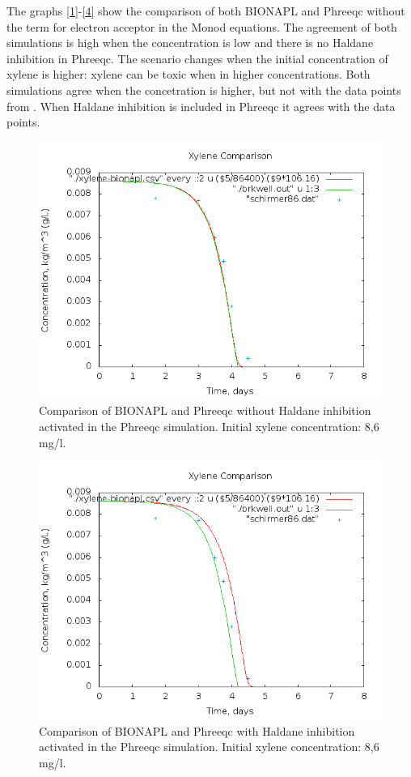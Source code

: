 \documentclass[12pt,twoside]{report}
\begin{document}
The graphs \eqref{1}-\eqref{4} show the comparison of both BIONAPL and Phreeqc without the term for electron acceptor in the Monod equations. The agreement of both simulations is high when the concentration is low and there is no Haldane inhibition in Phreeqc. The scenario changes when the initial concentration of xylene is higher: xylene can be toxic when in higher concentrations. Both simulations agree when the concetration is higher, but not with the data points from \cite{schirmer_relative-least-squares_1999}. When Haldane inhibition is included in Phreeqc it agrees with the data points. 
\begin{figure}[h]
\includegraphics[width=12cm]{img/comp-xylene86nohaldane.png}
\caption{Comparison of BIONAPL and Phreeqc without Haldane inhibition activated in the Phreeqc simulation. Initial xylene concentration: 8,6 mg/l.}
\label{1}
\end{figure}

\begin{figure}[h]
\includegraphics[width=14cm]{img/comp-xylene86haldane.png}
\caption{Comparison of BIONAPL and Phreeqc with Haldane inhibition activated in the Phreeqc simulation. Initial xylene concentration: 8,6 mg/l.}
\label{2}
\end{figure}
\end{document}
